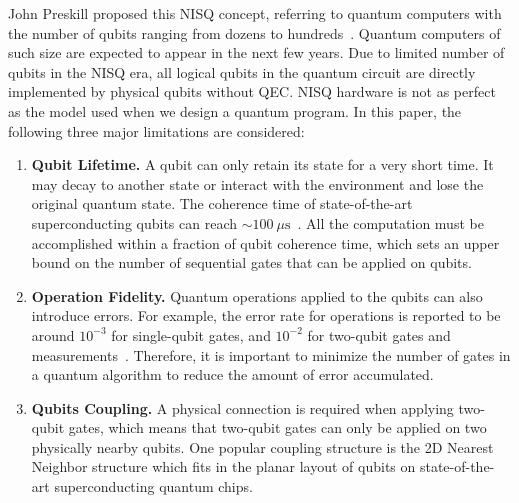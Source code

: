 \documentclass[journal,10pt,twocolumn]{IEEEtran}
\begin{document}




John Preskill proposed this NISQ concept, referring to quantum computers with the number of qubits ranging from dozens to hundreds~\cite{preskill2018quantum}. 
Quantum computers of such size are expected to appear in the next few years. 
Due to limited number of qubits in the NISQ era, all logical qubits in the quantum circuit are directly implemented by physical qubits without QEC.
NISQ hardware is not as perfect as the model used when we design a quantum program.
In this paper, the following three major limitations are considered:


\begin{enumerate}
\item \textbf{Qubit Lifetime.}
A qubit can only retain its state for a very short time. 
It may decay to another state or interact with the environment and lose the original quantum state.
The coherence time of state-of-the-art superconducting qubits can reach $\sim100~\mu\mathrm{s}$~\cite{IBMdevice}.
All the computation must be accomplished within a fraction of qubit coherence time, which sets an upper bound on the number of sequential gates that can be applied on qubits.


\item \textbf{Operation Fidelity.} 
Quantum operations applied to the qubits can also introduce errors. 
For example, the error rate for operations is reported to be around $10^{-3}$ for single-qubit gates, and $10^{-2}$ for two-qubit gates and measurements~\cite{IBMdevice,kelly2015state, walter2017rapid}.
Therefore, it is important to minimize the number of gates in a quantum algorithm to reduce the amount of error accumulated.

\item \textbf{Qubits Coupling.} 
A physical connection is required when applying two-qubit gates, which means that two-qubit gates can only be applied on two physically nearby qubits. One popular coupling structure is the 2D Nearest Neighbor structure which fits in the planar layout of qubits on state-of-the-art superconducting quantum chips.


\end{enumerate}
\end{document}
